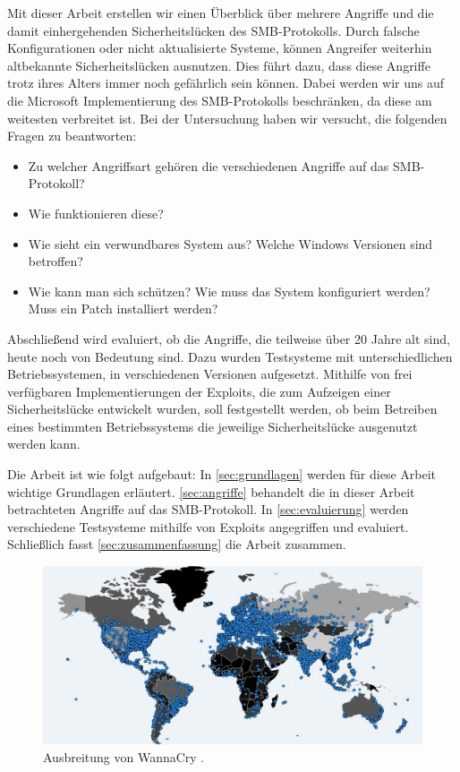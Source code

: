 \documentclass{AIFB_ITI_Crypto_Seminar}
\begin{document}
Mit dieser Arbeit erstellen wir einen Überblick über mehrere Angriffe und die damit einhergehenden Sicherheitslücken des SMB-Protokolls. Durch falsche Konfigurationen oder nicht aktualisierte Systeme, können Angreifer weiterhin altbekannte Sicherheitslücken ausnutzen. Dies führt dazu, dass diese Angriffe trotz ihres Alters immer noch gefährlich sein können. Dabei werden wir uns auf die Microsoft Implementierung des SMB-Protokolls beschränken, da diese am weitesten verbreitet ist. Bei der Untersuchung haben wir versucht, die folgenden Fragen zu beantworten:
\begin{itemize}
\item Zu welcher Angriffsart gehören die verschiedenen Angriffe auf das SMB-Protokoll? 
\item Wie funktionieren diese?
\item Wie sieht ein verwundbares System aus? Welche Windows Versionen sind betroffen?
\item Wie kann man sich schützen? Wie muss das System konfiguriert werden? Muss ein Patch installiert werden?
\end{itemize}
Abschließend wird evaluiert, ob die Angriffe, die teilweise über 20 Jahre alt sind, heute noch von Bedeutung sind. Dazu wurden Testsysteme mit unterschiedlichen Betriebssystemen, in verschiedenen Versionen aufgesetzt. Mithilfe von frei verfügbaren Implementierungen der Exploits, die zum Aufzeigen einer Sicherheitslücke entwickelt wurden, soll festgestellt werden, ob beim Betreiben eines bestimmten Betriebssystems die jeweilige Sicherheitslücke ausgenutzt werden kann.\par
Die Arbeit ist wie folgt aufgebaut: In \autoref{sec:grundlagen} werden für diese Arbeit wichtige Grundlagen erläutert. \autoref{sec:angriffe} behandelt die in dieser Arbeit betrachteten Angriffe auf das SMB-Protokoll. In \autoref{sec:evaluierung} werden verschiedene Testsysteme mithilfe von Exploits angegriffen und evaluiert. Schließlich fasst \autoref{sec:zusammenfassung} die Arbeit zusammen.

\begin{figure}
\center
  \includegraphics[width=1\textwidth]{Bilder/wannacry_map.png}
  \caption{Ausbreitung von WannaCry \cite{wannacry}.}
  \label{img:wannacry_map}
\end{figure}
\end{document}
